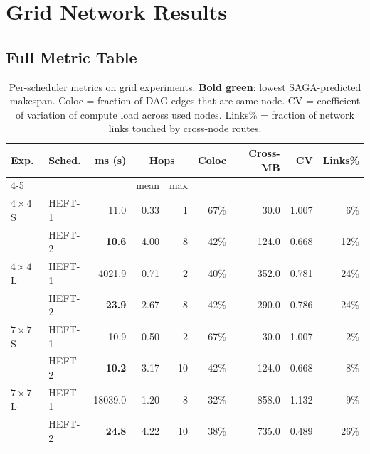 \documentclass[11pt]{article}
\newcommand{\win}[1]{\textcolor{green!50!black}{\textbf{#1}}}
\begin{document}
\section{Grid Network Results}

\subsection{Full Metric Table}

\begin{table}[H]
\centering
\small
\setlength{\tabcolsep}{3.5pt}
\begin{tabular}{l l r r@{\,}r r r r r}
\toprule
\textbf{Exp.} & \textbf{Sched.}
  & \textbf{ms (s)} & \multicolumn{2}{c}{\textbf{Hops}}
  & \textbf{Coloc} & \textbf{Cross-MB}
  & \textbf{CV} & \textbf{Links\%} \\
\cmidrule(lr){4-5}
 &  &  & mean & max &  &  &  & \\
\midrule
  $4\times4$ S & HEFT-1 & 11.0 & 0.33 & 1 & 67\% & 30.0 & 1.007 & 6\% \\
   & HEFT-2 & \win{10.6} & 4.00 & 8 & 42\% & 124.0 & 0.668 & 12\% \\
  \midrule
  $4\times4$ L & HEFT-1 & 4021.9 & 0.71 & 2 & 40\% & 352.0 & 0.781 & 24\% \\
   & HEFT-2 & \win{23.9} & 2.67 & 8 & 42\% & 290.0 & 0.786 & 24\% \\
  \midrule
  $7\times7$ S & HEFT-1 & 10.9 & 0.50 & 2 & 67\% & 30.0 & 1.007 & 2\% \\
   & HEFT-2 & \win{10.2} & 3.17 & 10 & 42\% & 124.0 & 0.668 & 8\% \\
  \midrule
  $7\times7$ L & HEFT-1 & 18039.0 & 1.20 & 8 & 32\% & 858.0 & 1.132 & 9\% \\
   & HEFT-2 & \win{24.8} & 4.22 & 10 & 38\% & 735.0 & 0.489 & 26\% \\
  \bottomrule
\end{tabular}
\caption{Per-scheduler metrics on grid experiments.
\win{Bold green}: lowest SAGA-predicted makespan.
Coloc = fraction of DAG edges that are same-node.
CV = coefficient of variation of compute load across used nodes.
Links\% = fraction of network links touched by cross-node routes.}
\end{table}
\end{document}
